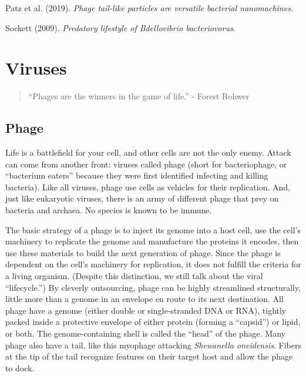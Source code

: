 \documentclass[]{tufte-book}
\begin{document}
Patz et al. (2019). \emph{Phage tail-like particles are versatile
bacterial nanomachines}.\citep{patz2019}

Sockett (2009). \emph{Predatory lifestyle of Bdellovibrio
bacteriovorus}.\citep{sockett2009}

\chapter{Viruses}\label{viruses}

\begin{quote}
``Phages are the winners in the game of life.'' - Forest Rohwer
\citep{rohwer2014}
\end{quote}

\section{Phage}\label{phage}

Life is a battlefield for your cell, and other cells are not the only
enemy. Attack can come from another front: viruses called phage (short
for bacteriophage, or ``bacterium eaters'' because they were first
identified infecting and killing bacteria). Like all viruses, phage use
cells as vehicles for their replication. And, just like eukaryotic
viruses, there is an army of different phage that prey on bacteria and
archaea. No species is known to be immune.

The basic strategy of a phage is to inject its genome into a host cell,
use the cell's machinery to replicate the genome and manufacture the
proteins it encodes, then use these materials to build the next
generation of phage. Since the phage is dependent on the cell's
machinery for replication, it does not fulfill the criteria for a living
organism. (Despite this distinction, we still talk about the viral
``lifecycle.'') By cleverly outsourcing, phage can be highly streamlined
structurally, little more than a genome in an envelope en route to its
next destination. All phage have a genome (either double or
single-stranded DNA or RNA), tightly packed inside a protective envelope
of either protein (forming a ``capsid'') or lipid, or both. The
genome-containing shell is called the ``head'' of the phage. Many phage
also have a tail, like this myophage attacking \emph{Shewanella
oneidensis}. Fibers at the tip of the tail recognize features on their
target host and allow the phage to dock.
\end{document}
